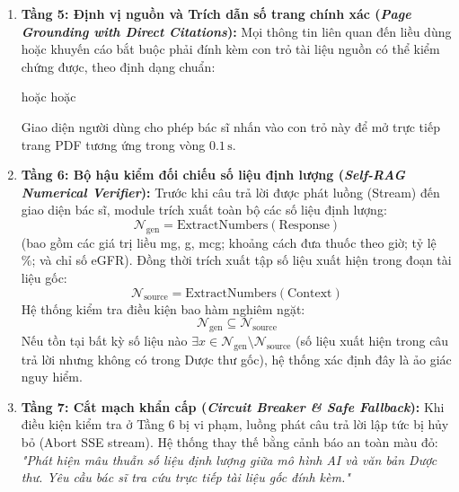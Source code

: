 \begin{enumerate}[leftmargin=2em]
    \item \textbf{Tầng 5: Định vị nguồn và Trích dẫn số trang chính xác (\textit{Page Grounding with Direct Citations}):}
    Mọi thông tin liên quan đến liều dùng hoặc khuyến cáo bắt buộc phải đính kèm con trỏ tài liệu nguồn có thể kiểm chứng được, theo định dạng chuẩn:
    \begin{center}
         \quad hoặc \quad {} \quad hoặc \quad {}
    \end{center}
    Giao diện người dùng cho phép bác sĩ nhấn vào con trỏ này để mở trực tiếp trang PDF tương ứng trong vòng $0.1\,\text{s}$.

    \item \textbf{Tầng 6: Bộ hậu kiểm đối chiếu số liệu định lượng (\textit{Self-RAG Numerical Verifier}):}
    Trước khi câu trả lời được phát luồng (Stream) đến giao diện bác sĩ, module  trích xuất toàn bộ các số liệu định lượng:
    \begin{equation}
        \mathcal{N}_{\text{gen}} = \text{ExtractNumbers}(\text{Response})
    \end{equation}
    (bao gồm các giá trị liều mg, g, mcg; khoảng cách đưa thuốc theo giờ; tỷ lệ \%; và chỉ số eGFR). Đồng thời trích xuất tập số liệu xuất hiện trong đoạn tài liệu gốc:
    \begin{equation}
        \mathcal{N}_{\text{source}} = \text{ExtractNumbers}(\text{Context})
    \end{equation}
    Hệ thống kiểm tra điều kiện bao hàm nghiêm ngặt:
    \begin{equation}
        \mathcal{N}_{\text{gen}} \subseteq \mathcal{N}_{\text{source}}
    \end{equation}
    Nếu tồn tại bất kỳ số liệu nào $\exists x \in \mathcal{N}_{\text{gen}} \setminus \mathcal{N}_{\text{source}}$ (số liệu xuất hiện trong câu trả lời nhưng không có trong Dược thư gốc), hệ thống xác định đây là ảo giác nguy hiểm.

    \item \textbf{Tầng 7: Cắt mạch khẩn cấp (\textit{Circuit Breaker \& Safe Fallback}):}
    Khi điều kiện kiểm tra ở Tầng 6 bị vi phạm, luồng phát câu trả lời lập tức bị hủy bỏ (Abort SSE stream). Hệ thống thay thế bằng cảnh báo an toàn màu đỏ: \textit{"Phát hiện mâu thuẫn số liệu định lượng giữa mô hình AI và văn bản Dược thư. Yêu cầu bác sĩ tra cứu trực tiếp tài liệu gốc đính kèm."}
\end{enumerate}

